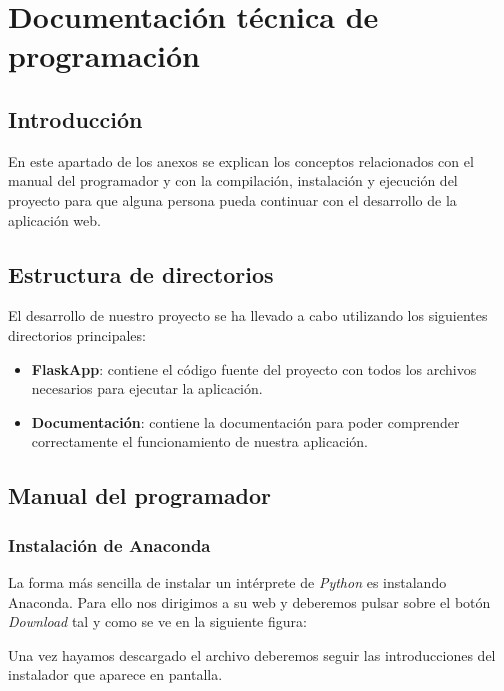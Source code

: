\chapter[Documentación de programación]{Documentación técnica de programación}


\section{Introducción}

En este apartado de los anexos se explican los conceptos relacionados con el manual del programador y con la compilación, instalación y ejecución del proyecto para que alguna persona pueda continuar con el desarrollo de la aplicación web.

\section{Estructura de directorios}

El desarrollo de nuestro proyecto se ha llevado a cabo utilizando los siguientes directorios principales:

\begin{itemize}
\item \textbf{FlaskApp}: contiene el código fuente del proyecto con todos los archivos necesarios para ejecutar la aplicación.
\item \textbf{Documentación}: contiene la documentación para poder comprender correctamente el funcionamiento de nuestra aplicación. 
\end{itemize}

\section{Manual del programador}

\subsection{Instalación de Anaconda}

La forma más sencilla de instalar un intérprete de 	\textit{Python} es instalando Anaconda. Para ello nos dirigimos a su web \cite{anaconda} y deberemos pulsar sobre el botón \textit{Download} tal y como se ve en la siguiente figura:


Una vez hayamos descargado el archivo deberemos seguir las introducciones del instalador que aparece en pantalla.

